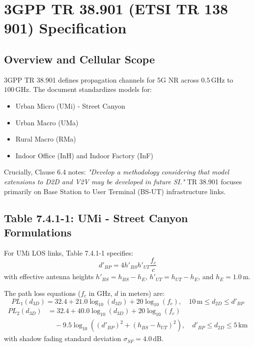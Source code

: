 \documentclass[11pt,a4paper]{article}
\begin{document}
\section{3GPP TR 38.901 (ETSI TR 138 901) Specification}

\subsection{Overview and Cellular Scope}
3GPP TR 38.901 defines propagation channels for 5G NR across $0.5\,\text{GHz}$ to $100\,\text{GHz}$. The document standardizes models for:
\begin{itemize}[noitemsep]
    \item Urban Micro (UMi) - Street Canyon
    \item Urban Macro (UMa)
    \item Rural Macro (RMa)
    \item Indoor Office (InH) and Indoor Factory (InF)
\end{itemize}

Crucially, Clause 6.4 notes: \textit{"Develop a methodology considering that model extensions to D2D and V2V may be developed in future SI."} TR 38.901 focuses primarily on Base Station to User Terminal (BS-UT) infrastructure links.

\subsection{Table 7.4.1-1: UMi - Street Canyon Formulations}
For UMi LOS links, Table 7.4.1-1 specifies:
\begin{equation}
d'_{BP} = 4 h'_{BS} h'_{UT} \frac{f_c}{c}
\end{equation}
with effective antenna heights $h'_{BS} = h_{BS} - h_E$, $h'_{UT} = h_{UT} - h_E$, and $h_E = 1.0\,\text{m}$.

The path loss equations ($f_c$ in GHz, $d$ in meters) are:
\begin{equation}
PL_1(d_{3D}) = 32.4 + 21.0 \log_{10}(d_{3D}) + 20 \log_{10}(f_c), \quad 10\,\text{m} \le d_{2D} \le d'_{BP}
\end{equation}
\begin{align}
PL_2(d_{3D}) &= 32.4 + 40.0 \log_{10}(d_{3D}) + 20 \log_{10}(f_c) \nonumber \\
&\quad - 9.5 \log_{10}\left( (d'_{BP})^2 + (h_{BS} - h_{UT})^2 \right), \quad d'_{BP} \le d_{2D} \le 5\,\text{km}
\end{align}
with shadow fading standard deviation $\sigma_{SF} = 4.0\,\text{dB}$.
\end{document}
